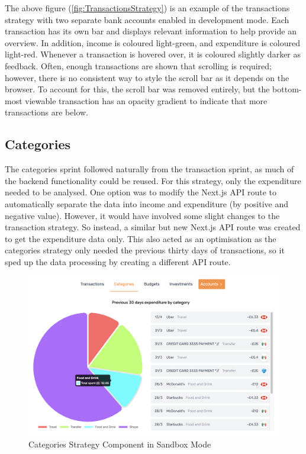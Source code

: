 The above figure (\ref{fig:TransactionsStrategy}) is an example of the transactions strategy with two separate bank accounts enabled in development mode. Each transaction has its own bar and displays relevant information to help provide an overview. In addition, income is coloured light-green, and expenditure is coloured light-red. Whenever a transaction is hovered over, it is coloured slightly darker as feedback. Often, enough transactions are shown that scrolling is required; however, there is no consistent way to style the scroll bar as it depends on the browser. To account for this, the scroll bar was removed entirely, but the bottom-most viewable transaction has an opacity gradient to indicate that more transactions are below.

\subsection{Categories}
The categories sprint followed naturally from the transaction sprint, as much of the backend functionality could be reused. For this strategy, only the expenditure needed to be analysed. One option was to modify the Next.js API route to automatically separate the data into income and expenditure (by positive and negative value). However, it would have involved some slight changes to the transaction strategy. So instead, a similar but new Next.js API route was created to get the expenditure data only. This also acted as an optimisation as the categories strategy only needed the previous thirty days of transactions, so it sped up the data processing by creating a different API route.

\begin{figure}[H]
	\centering
	\includegraphics[width=\textwidth]{images/categories_sandbox.png}
	\caption{Categories Strategy Component in Sandbox Mode}
	\label{fig:CategoriesStrategySandbox}
\end{figure}

